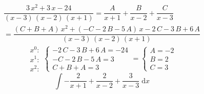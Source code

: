 \documentclass[../rgr1.tex]{subfiles}
\begin{document}
\Solution

\begin{equation}
	\begin{aligned}
	\dfrac{3\,{x}^{2}+3\,x-24}{\left(x-3\right)\,\left(x-2\right)\,\left(x+1\right)}=\dfrac{A}{x+1}+\dfrac{B}{x-2}+\dfrac{C}{x-3}\\
	=\dfrac{\left(C+B+A\right)\,{x}^{2}+\left(-C-2\,B-5\,A\right)\,x-2\,C-3\,B+6\,A}{\left(x-3\right)\,\left(x-2\right)\,\left(x+1\right)}
	\end{aligned}
\end{equation}
\begin{equation}
\begin{gathered}x^{0}:\\x^{1}:\\x^{2}:\end{gathered}\left\{\begin{gathered}-2\,C-3\,B+6\,A=-24\\-C-2\,B-5\,A=3\\C+B+A=3\end{gathered}\right.=\left\{\begin{gathered}A=-2\\B=2\\C=3\end{gathered}\right.
\end{equation}
\begin{equation}
	\int{-\dfrac{2}{x+1}+\dfrac{2}{x-2}+\dfrac{3}{x-3}}{\;\mathrm{d}x}
\end{equation}

\end{document}
